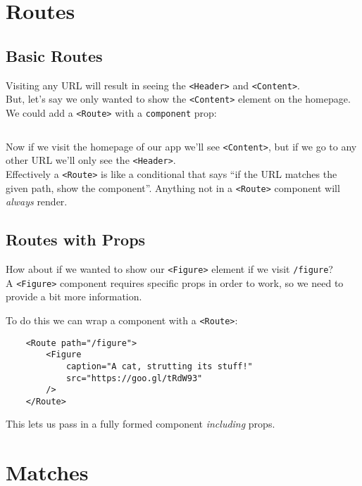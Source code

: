 \pagebreak


\section{Routes}

\subsection{Basic Routes}

Visiting any URL will result in seeing the \texttt{<Header>} and \texttt{<Content>}.
\\

But, let's say we only wanted to show the \texttt{<Content>} element on the homepage. We could add a \texttt{<Route>} with a \texttt{component} prop:

\inputminted{jsx}{06-router/figures/02-component.jsx}

Now if we visit the homepage of our app we'll see \texttt{<Content>}, but if we go to any other URL we'll only see the \texttt{<Header>}.
\\

Effectively a \texttt{<Route>} is like a conditional that says ``if the URL matches the given path, show the component''. Anything not in a \texttt{<Route>} component will \textit{always} render.


\subsection{Routes with Props}

How about if we wanted to show our \texttt{<Figure>} element if we visit \texttt{/figure}?
\\

A \texttt{<Figure>} component requires specific props in order to work, so we need to provide a bit more information.

\pagebreak

To do this we can wrap a component with a \texttt{<Route>}:

\begin{verbatim}
    <Route path="/figure">
        <Figure
            caption="A cat, strutting its stuff!"
            src="https://goo.gl/tRdW93"
        />
    </Route>
\end{verbatim}

This lets us pass in a fully formed component \textit{including} props.



\section{Matches}

